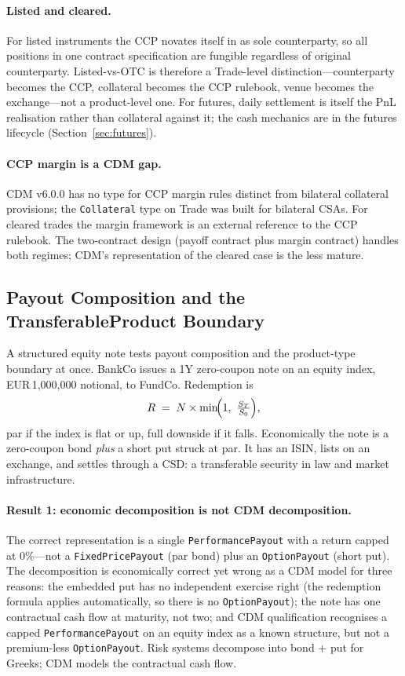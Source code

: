 \documentclass[11pt,a4paper]{article}
\begin{document}
\paragraph{Listed and cleared.} For listed instruments the CCP novates itself in as sole counterparty, so all positions in one contract specification are fungible regardless of original counterparty. Listed-vs-OTC is therefore a Trade-level distinction---counterparty becomes the CCP, collateral becomes the CCP rulebook, venue becomes the exchange---not a product-level one. For futures, daily settlement is itself the PnL realisation rather than collateral against it; the cash mechanics are in the futures lifecycle (Section~\ref{sec:futures}).

\paragraph{CCP margin is a CDM gap.} CDM v6.0.0 has no type for CCP margin rules distinct from bilateral collateral provisions; the \texttt{Collateral} type on Trade was built for bilateral CSAs. For cleared trades the margin framework is an external reference to the CCP rulebook. The two-contract design (payoff contract plus margin contract) handles both regimes; CDM's representation of the cleared case is the less mature.

\subsection{Payout Composition and the TransferableProduct Boundary}
\label{sec:cdm-structured-note}

A structured equity note tests payout composition and the product-type boundary at once. BankCo issues a 1Y zero-coupon note on an equity index, EUR\,1{,}000{,}000 notional, to FundCo. Redemption is
\[
R \;=\; N \times \min\!\Bigl(1,\ \tfrac{S_T}{S_0}\Bigr),
\]
par if the index is flat or up, full downside if it falls. Economically the note is a zero-coupon bond \emph{plus} a short put struck at par. It has an ISIN, lists on an exchange, and settles through a CSD: a transferable security in law and market infrastructure.

\paragraph{Result 1: economic decomposition is not CDM decomposition.} The correct representation is a single \texttt{PerformancePayout} with a return capped at 0\%---not a \texttt{FixedPricePayout} (par bond) plus an \texttt{OptionPayout} (short put). The decomposition is economically correct yet wrong as a CDM model for three reasons: the embedded put has no independent exercise right (the redemption formula applies automatically, so there is no \texttt{OptionPayout}); the note has one contractual cash flow at maturity, not two; and CDM qualification recognises a capped \texttt{PerformancePayout} on an equity index as a known structure, but not a premium-less \texttt{OptionPayout}. Risk systems decompose into bond + put for Greeks; CDM models the contractual cash flow.
\end{document}
